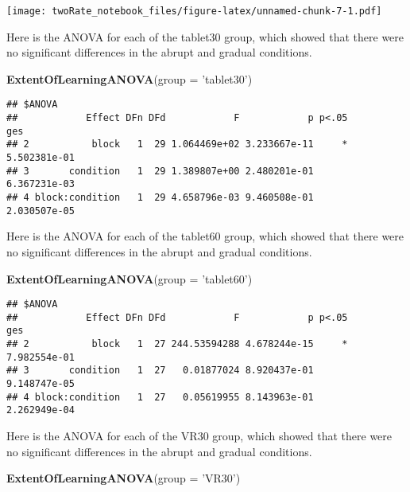 \documentclass[]{article}
\newenvironment{Shaded}{\begin{snugshade}}{\end{snugshade}}
\newcommand{\KeywordTok}[1]{\textcolor[rgb]{0.13,0.29,0.53}{\textbf{#1}}}
\newcommand{\DataTypeTok}[1]{\textcolor[rgb]{0.13,0.29,0.53}{#1}}
\newcommand{\StringTok}[1]{\textcolor[rgb]{0.31,0.60,0.02}{#1}}
\newcommand{\NormalTok}[1]{#1}
\begin{document}
\texttt{[image: twoRate\_notebook\_files/figure-latex/unnamed-chunk-7-1.pdf]}

Here is the ANOVA for each of the tablet30 group, which showed that
there were no significant differences in the abrupt and gradual
conditions.

\begin{Shaded}
\begin{Highlighting}[]
\KeywordTok{ExtentOfLearningANOVA}\NormalTok{(}\DataTypeTok{group =} \StringTok{'tablet30'}\NormalTok{)}
\end{Highlighting}
\end{Shaded}

\begin{verbatim}
## $ANOVA
##            Effect DFn DFd            F            p p<.05          ges
## 2           block   1  29 1.064469e+02 3.233667e-11     * 5.502381e-01
## 3       condition   1  29 1.389807e+00 2.480201e-01       6.367231e-03
## 4 block:condition   1  29 4.658796e-03 9.460508e-01       2.030507e-05
\end{verbatim}

Here is the ANOVA for each of the tablet60 group, which showed that
there were no significant differences in the abrupt and gradual
conditions.

\begin{Shaded}
\begin{Highlighting}[]
\KeywordTok{ExtentOfLearningANOVA}\NormalTok{(}\DataTypeTok{group =} \StringTok{'tablet60'}\NormalTok{)}
\end{Highlighting}
\end{Shaded}

\begin{verbatim}
## $ANOVA
##            Effect DFn DFd            F            p p<.05          ges
## 2           block   1  27 244.53594288 4.678244e-15     * 7.982554e-01
## 3       condition   1  27   0.01877024 8.920437e-01       9.148747e-05
## 4 block:condition   1  27   0.05619955 8.143963e-01       2.262949e-04
\end{verbatim}

Here is the ANOVA for each of the VR30 group, which showed that there
were no significant differences in the abrupt and gradual conditions.

\begin{Shaded}
\begin{Highlighting}[]
\KeywordTok{ExtentOfLearningANOVA}\NormalTok{(}\DataTypeTok{group =} \StringTok{'VR30'}\NormalTok{)}
\end{Highlighting}
\end{Shaded}
\end{document}

